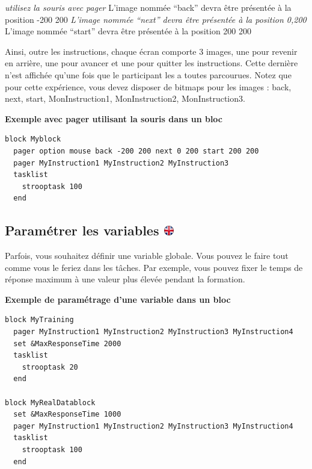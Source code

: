 \documentclass[
]{book}
\begin{document}
\emph{utilisez la souris avec pager
}L'image nommée ``back'' devra être présentée à la position -200 200
\emph{L'image nommée ``next'' devra être présentée à la position 0,200
}L'image nommée ``start'' devra être présentée à la position 200 200

Ainsi, outre les instructions, chaque écran comporte 3 images, une pour revenir en arrière, une pour avancer et une pour quitter les instructions. Cette dernière n'est affichée qu'une fois que le participant les a toutes parcourues. Notez que pour cette expérience, vous devez disposer de bitmaps pour les images : back, next, start, MonInstruction1, MonInstruction2, MonInstruction3.

\textbf{Exemple avec pager utilisant la souris dans un bloc}

\begin{verbatim}
block Myblock
  pager option mouse back -200 200 next 0 200 start 200 200
  pager MyInstruction1 MyInstruction2 MyInstruction3
  tasklist
    strooptask 100
  end
\end{verbatim}

\hypertarget{paramuxe9trer-les-variables}{%
\subsection[Paramétrer les variables ]{\texorpdfstring{Paramétrer les variables \href{https://www.psytoolkit.org/doc3.4.0/syntax.html\#block-set}{\protect\includegraphics{img/ukflag.png}}}{Paramétrer les variables }}\label{paramuxe9trer-les-variables}}

Parfois, vous souhaitez définir une variable globale. Vous pouvez le faire tout comme vous le feriez dans les tâches. Par exemple, vous pouvez fixer le temps de réponse maximum à une valeur plus élevée pendant la formation.

\textbf{Exemple de paramétrage d'une variable dans un bloc}

\begin{verbatim}
block MyTraining
  pager MyInstruction1 MyInstruction2 MyInstruction3 MyInstruction4
  set &MaxResponseTime 2000
  tasklist
    strooptask 20
  end

block MyRealDatablock
  set &MaxResponseTime 1000
  pager MyInstruction1 MyInstruction2 MyInstruction3 MyInstruction4
  tasklist
    strooptask 100
  end
\end{verbatim}
\end{document}
